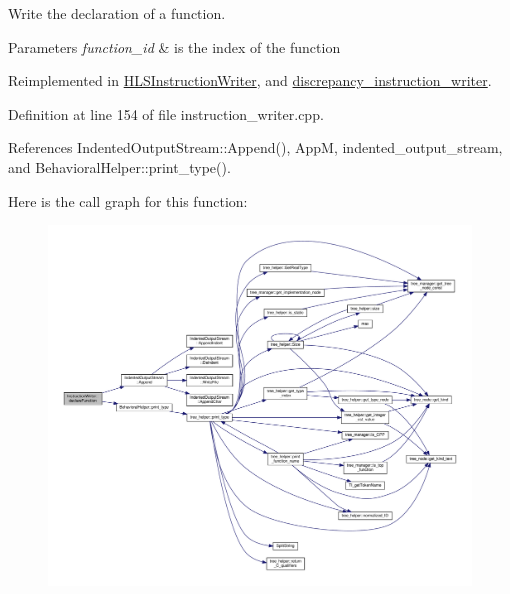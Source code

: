 Write the declaration of a function. 


\begin{DoxyParams}{Parameters}
{\em function\+\_\+id} & is the index of the function \\
\hline
\end{DoxyParams}


Reimplemented in \hyperlink{classHLSInstructionWriter_af6de1a6a4a37f62779bc688ad89a0a08}{H\+L\+S\+Instruction\+Writer}, and \hyperlink{classdiscrepancy__instruction__writer_a7cdc4c4bb3fd4ce16b91ca818271d2b8}{discrepancy\+\_\+instruction\+\_\+writer}.



Definition at line 154 of file instruction\+\_\+writer.\+cpp.



References Indented\+Output\+Stream\+::\+Append(), AppM, indented\+\_\+output\+\_\+stream, and Behavioral\+Helper\+::print\+\_\+type().

Here is the call graph for this function\+:
\nopagebreak
\begin{figure}[H]
\begin{center}
\leavevmode
\includegraphics[width=350pt]{d3/d00/classInstructionWriter_adb886a6fe469c8b1142c63ee31c4a2f1_cgraph}
\end{center}
\end{figure}
\mbox{\label{classInstructionWriter_ad194c685f8c1e718bc02c2c01cdd72d7}} 
